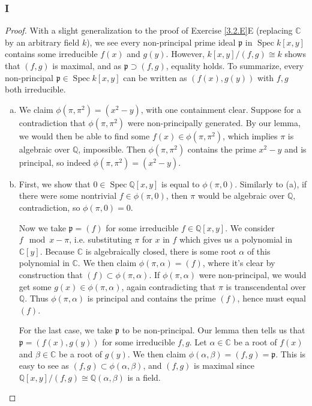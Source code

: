 \documentclass{article}
\newcommand{\Q}{\mathbb{Q}}
\newcommand{\C}{\mathbb{C}}
\newcommand{\frkp}{\mathfrak{p}}
\DeclareMathOperator{\Spec}{\mathrm{Spec}}
\begin{document}
\subsubsection{I}\label{3.2.I}
\begin{proof}
    With a slight generalization to the proof of Exercise \ref{3.2.E}E (replacing $\C$ by an arbitrary field $k$), we see every non-principal prime ideal $\frkp$ in $\Spec k[x,y]$ contains some irreducible $f(x)$ and $g(y)$. However, $k[x,y]/(f,g)\cong k$ shows that $(f,g)$ is maximal, and as $\frkp\supset (f,g)$, equality holds. To summarize, every non-principal $\frkp \in \Spec k[x,y]$ can be written as $(f(x),g(y))$ with $f,g$ both irreducible.
    \begin{enumerate}[(a)]
        \item We claim $\phi(\pi, \pi^2)=(x^2-y)$, with one containment clear. Suppose for a contradiction that  $\phi(\pi, \pi^2)$ were non-principally generated. By our lemma, we would then be able to find some $f(x)\in \phi(\pi,\pi^2)$, which implies $\pi$ is algebraic over $\Q$, impossible. Then $\phi(\pi,\pi^2)$ contains the prime $x^2-y$ and is principal, so indeed $\phi(\pi,\pi^2)=(x^2-y)$.
        \item First, we show that $0\in \Spec \Q[x,y]$ is equal to $\phi(\pi,0)$. Similarly to (a), if there were some nontrivial $f\in \phi(\pi,0)$, then $\pi$ would be algebraic over $\Q$, contradiction, so $\phi(\pi,0)=0$.

        Now we take $\frkp=(f)$ for some irreducible $f\in \Q[x,y]$. We consider $f \mod x-\pi$, i.e. substituting $\pi$ for $x$ in $f$ which gives us a polynomial in $\C[y]$. Because $\C$ is algebraically closed, there is some root $\alpha$ of this polynomial in $\C$. We then claim $\phi(\pi, \alpha)=(f)$, where it's clear by construction that $(f)\subset \phi(\pi, \alpha)$. If $\phi(\pi, \alpha)$ were non-principal, we would get some $g(x)\in \phi(\pi, \alpha)$, again contradicting that $\pi$ is transcendental over $\Q$. Thus $\phi(\pi, \alpha)$ is principal and contains the prime $(f)$, hence must equal $(f)$.

        For the last case, we take $\frkp$ to be non-principal. Our lemma then tells us that $\frkp=(f(x),g(y))$ for some irreducible $f,g$. Let $\alpha\in \C$ be a root of $f(x)$ and $\beta\in \C$ be a root of $g(y)$. We then claim $\phi(\alpha,\beta)=(f,g)=\frkp$. This is easy to see as $(f,g)\subset \phi(\alpha,\beta)$, and $(f,g)$ is maximal since $\Q[x,y]/(f,g)\cong \Q(\alpha,\beta)$ is a field.
    \end{enumerate}
\end{proof}
\end{document}
